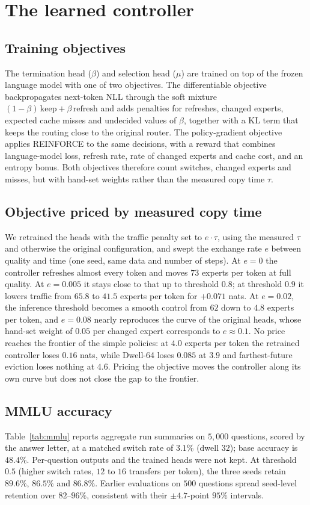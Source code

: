 \documentclass{article}
\begin{document}
\section{The learned controller}
\label{app:controller}

\subsection{Training objectives}
The termination head ($\beta$) and selection
head ($\mu$) are trained on top of the frozen language model with one of two
objectives. The differentiable objective backpropagates next-token NLL
through the soft mixture $(1-\beta)\,\text{keep}+\beta\,\text{refresh}$ and
adds penalties for refreshes, changed experts, expected cache misses and
undecided values of $\beta$, together with a KL term that keeps the routing
close to the original router. The policy-gradient objective applies REINFORCE
to the same decisions, with a reward that combines language-model loss,
refresh rate, rate of changed experts and cache cost, and an entropy bonus.
Both objectives therefore count switches, changed experts and misses, but
with hand-set weights rather than the measured copy time $\tau$.

\subsection{Objective priced by measured copy time}
We retrained the
heads with the traffic penalty set to $e\cdot\tau$, using the measured $\tau$
and otherwise the original configuration, and swept the exchange rate $e$
between quality and time (one seed, same data and number of steps). At $e=0$
the controller refreshes almost every token and moves $73$ experts per token
at full quality. At $e=0.005$ it stays close to that up to threshold $0.8$; at
threshold $0.9$ it lowers traffic from $65.8$ to $41.5$ experts per token for
$+0.071$ nats. At $e=0.02$, the inference threshold becomes a smooth control
from $62$ down to $4.8$ experts per token, and $e=0.08$ nearly reproduces the
curve of the original heads, whose hand-set weight of $0.05$ per changed
expert corresponds to $e\approx0.1$. No price reaches the frontier of the
simple policies: at $4.0$ experts per token the retrained controller loses
$0.16$ nats, while Dwell-64 loses $0.085$ at $3.9$ and farthest-future
eviction loses nothing at $4.6$. Pricing the objective moves the controller
along its own curve but does not close the gap to the frontier.

\subsection{MMLU accuracy}
Table~\ref{tab:mmlu} reports aggregate run summaries
on $5{,}000$ questions, scored by the answer letter, at a matched switch rate
of $3.1\%$ (dwell $32$); base accuracy is $48.4\%$. Per-question outputs and
the trained heads were not kept. At threshold $0.5$ (higher switch rates, $12$
to $16$ transfers per token), the three seeds retain $89.6\%$, $86.5\%$ and
$86.8\%$. Earlier evaluations on $500$ questions spread seed-level retention
over $82$--$96\%$, consistent with their $\pm4.7$-point $95\%$ intervals.
\end{document}
